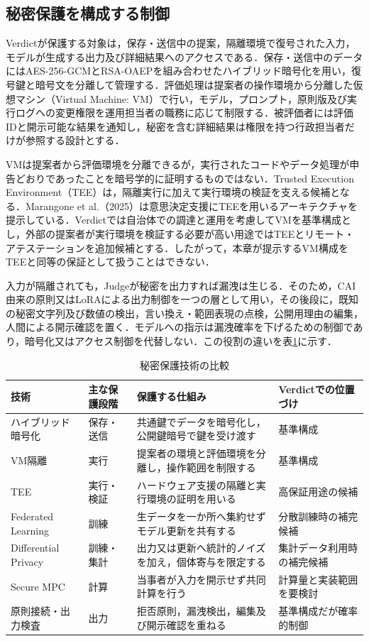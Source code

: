 \subsection{秘密保護を構成する制御}

Verdictが保護する対象は，保存・送信中の提案，隔離環境で復号された入力，モデルが生成する出力及び詳細結果へのアクセスである．保存・送信中のデータにはAES-256-GCMとRSA-OAEPを組み合わせたハイブリッド暗号化を用い，復号鍵と暗号文を分離して管理する．評価処理は提案者の操作環境から分離した仮想マシン（Virtual Machine: VM）で行い，モデル，プロンプト，原則版及び実行ログへの変更権限を運用担当者の職務に応じて制限する．被評価者には評価IDと開示可能な結果を通知し，秘密を含む詳細結果は権限を持つ行政担当者だけが参照する設計とする．

VMは提案者から評価環境を分離できるが，実行されたコードやデータ処理が申告どおりであったことを暗号学的に証明するものではない．Trusted Execution Environment（TEE）は，隔離実行に加えて実行環境の検証を支える候補となる．Marangone et al.（2025）は意思決定支援にTEEを用いるアーキテクチャを提示している\cite{marangone2025sparta}．Verdictでは自治体での調達と運用を考慮してVMを基準構成とし，外部の提案者が実行環境を検証する必要が高い用途ではTEEとリモート・アテステーションを追加候補とする．したがって，本章が提示するVM構成をTEEと同等の保証として扱うことはできない．

入力が隔離されても，Judgeが秘密を出力すれば漏洩は生じる．そのため，CAI由来の原則又はLoRAによる出力制御を一つの層として用い，その後段に，既知の秘密文字列及び数値の検出，言い換え・範囲表現の点検，公開用理由の編集，人間による開示確認を置く．モデルへの指示は漏洩確率を下げるための制御であり，暗号化又はアクセス制御を代替しない．この役割の違いを表\ref{tab:ch5_privacy_comparison}に示す．

\begin{table}[htb]
\caption{秘密保護技術の比較}
\label{tab:ch5_privacy_comparison}
\centering
\small
\begin{tabularx}{\columnwidth}{p{}p{}X p{}}
\toprule
技術 & 主な保護段階 & 保護する仕組み & Verdictでの位置づけ \\
\midrule
ハイブリッド暗号化 & 保存・送信 & 共通鍵でデータを暗号化し，公開鍵暗号で鍵を受け渡す & 基準構成 \\
VM隔離 & 実行 & 提案者の環境と評価環境を分離し，操作範囲を制限する & 基準構成 \\
TEE & 実行・検証 & ハードウェア支援の隔離と実行環境の証明を用いる & 高保証用途の候補 \\
Federated Learning & 訓練 & 生データを一か所へ集約せずモデル更新を共有する & 分散訓練時の補完候補 \\
Differential Privacy & 訓練・集計 & 出力又は更新へ統計的ノイズを加え，個体寄与を限定する & 集計データ利用時の補完候補 \\
Secure MPC & 計算 & 当事者が入力を開示せず共同計算を行う & 計算量と実装範囲を要検討 \\
原則接続・出力検査 & 出力 & 拒否原則，漏洩検出，編集及び開示確認を重ねる & 基準構成だが確率的制御 \\
\bottomrule
\end{tabularx}
\end{table}


